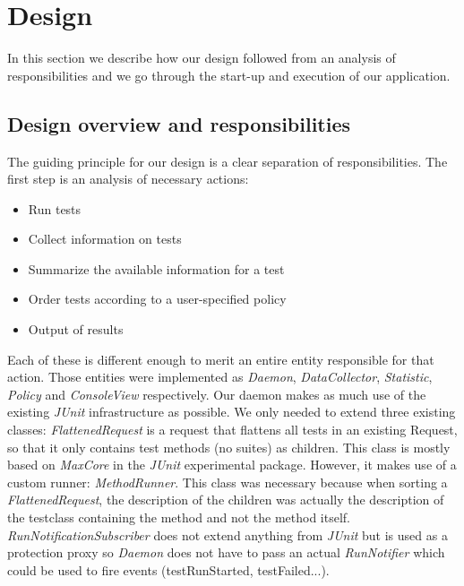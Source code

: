 \documentclass[i2]{oss}
\newcommand{\class}[1]{\emph{#1}}
\newcommand{\junit}{\emph{JUnit }}
\begin{document}
\section{Design}
\label{ssec:design}

In this section we describe how our design followed from an analysis
of responsibilities and we go through the start-up and execution of 
our application.

\subsection{Design overview and responsibilities}

The guiding principle for our design is a clear separation of 
responsibilities. The first step is an analysis of necessary actions:

\begin{itemize}
	\item Run tests
    \item Collect information on tests
    \item Summarize the available information for a test
    \item Order tests according to a user-specified policy
    \item Output of results
\end{itemize}

Each of these is different enough to merit an entire entity responsible 
for that action. Those entities were implemented as \class{Daemon},
\class{DataCollector}, \class{Statistic}, \class{Policy} and
\class{ConsoleView} respectively. Our daemon makes as much use of the 
existing \junit infrastructure as possible. 
We only needed to extend three existing classes: \class{FlattenedRequest}
is a request that flattens all tests in an existing Request, so that it only contains test methods (no suites) as children. 
This class is mostly based on \class{MaxCore} in the \junit experimental package. 
However, it makes use of a custom runner: \class{MethodRunner}. 
This class was necessary because when sorting a \class{FlattenedRequest}, the description of the children was actually the
description of the testclass containing the method and not the method 
itself.
\class{RunNotificationSubscriber} does not extend anything from 
\junit but is used as a protection proxy so \class{Daemon} does not have 
to pass an actual \class{RunNotifier} which could be used to fire events 
(testRunStarted, testFailed...). 
\end{document}
